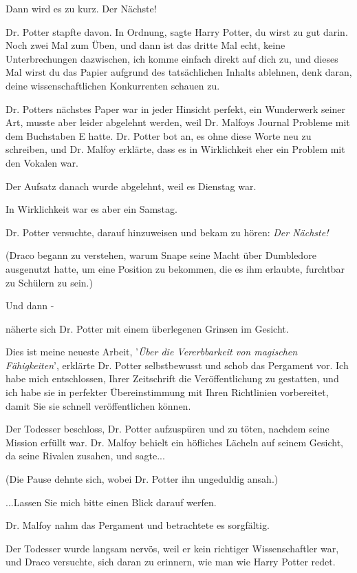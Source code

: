 \glqq Dann wird es zu kurz. Der Nächste!\grqq{}

Dr. Potter stapfte davon. \glqq In Ordnung\grqq{}, sagte Harry Potter, \glqq du
wirst zu gut darin. Noch zwei Mal zum Üben, und dann ist das dritte Mal echt,
keine Unterbrechungen dazwischen, ich komme einfach direkt auf dich zu, und
dieses Mal wirst du das Papier aufgrund des tatsächlichen Inhalts ablehnen, denk
daran, deine wissenschaftlichen Konkurrenten schauen zu.\grqq{}

Dr. Potters nächstes Paper war in jeder Hinsicht perfekt, ein Wunderwerk seiner
Art, musste aber leider abgelehnt werden, weil Dr. Malfoys Journal Probleme mit
dem Buchstaben E hatte. Dr. Potter bot an, es ohne diese Worte neu zu schreiben,
und Dr. Malfoy erklärte, dass es in Wirklichkeit eher ein Problem mit den
Vokalen war.

Der Aufsatz danach wurde abgelehnt, weil es Dienstag war.

In Wirklichkeit war es aber ein Samstag.

Dr. Potter versuchte, darauf hinzuweisen und bekam zu hören: \emph{\glqq Der
Nächste!\grqq{} }

(Draco begann zu verstehen, warum Snape seine Macht über Dumbledore ausgenutzt
hatte, um eine Position zu bekommen, die es ihm erlaubte, furchtbar zu Schülern
zu sein.)

Und dann -

näherte sich Dr. Potter mit einem überlegenen Grinsen im Gesicht.

\glqq Dies ist meine neueste Arbeit, '\emph{Über die Vererbbarkeit von magischen
Fähigkeiten}', erklärte Dr. Potter selbstbewusst und schob das Pergament vor.
\glqq Ich habe mich entschlossen, Ihrer Zeitschrift die Veröffentlichung zu
gestatten, und ich habe sie in perfekter Übereinstimmung mit Ihren Richtlinien
vorbereitet, damit Sie sie schnell veröffentlichen können.\grqq{}

Der Todesser beschloss, Dr. Potter aufzuspüren und zu töten, nachdem seine
Mission erfüllt war. Dr. Malfoy behielt ein höfliches Lächeln auf seinem
Gesicht, da seine Rivalen zusahen, und sagte...

(Die Pause dehnte sich, wobei Dr. Potter ihn ungeduldig ansah.)

...\glqq Lassen Sie mich bitte einen Blick darauf werfen.\grqq{}

Dr. Malfoy nahm das Pergament und betrachtete es sorgfältig.

Der Todesser wurde langsam nervös, weil er kein richtiger Wissenschaftler war,
und Draco versuchte, sich daran zu erinnern, wie man wie Harry Potter redet.

